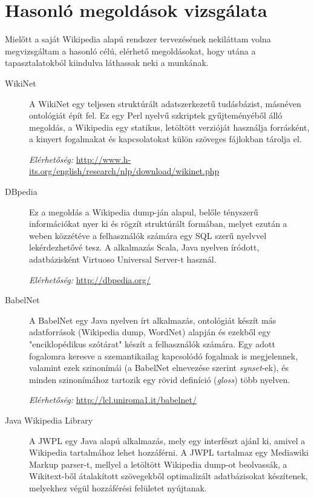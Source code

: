 \chapter{Hasonló megoldások vizsgálata}
\label{cha:related_work}

Mielőtt a saját Wikipedia alapú rendszer tervezésének nekiláttam volna megvizsgáltam a hasonló célú, elérhető megoldásokat, hogy utána a tapasztalatokból kiindulva láthassak neki a munkának.

\begin{description}
	\item[WikiNet\cite{wikinet}] A WikiNet egy teljesen struktúrált adatszerkezetű tudásbázist, másnéven ontológiát épít fel. Ez egy Perl nyelvű szkriptek gyűjteményéből álló megoldás, a Wikipedia egy statikus, letöltött verzióját használja forrásként, a kinyert fogalmakat és kapcsolatokat külön szöveges fájlokban tárolja el.
	
\textit{Elérhetőség:} \url{http://www.h-its.org/english/research/nlp/download/wikinet.php}

	\item[DBpedia] Ez a megoldás a Wikipedia dump-ján alapul, belőle tényszerű információkat nyer ki és rögzít struktúrált formában, melyet ezután a weben közzétéve a felhasználók számára egy SQL szerű nyelvvel lekérdezhetővé tesz. A alkalmazás Scala, Java nyelven íródott, adatbázisként Virtuoso Universal Server-t használ.
	
\textit{Elérhetőség:} \url{http://dbpedia.org/}

\item[BabelNet\cite{babelnet}] A BabelNet egy Java nyelven írt alkalmazás, ontológiát készít más adatforrások (Wikipedia dump, WordNet) alapján és ezekből egy "enciklopédikus szótárat" készít a felhasználók számára. Egy adott fogalomra keresve a szemantikailag kapcsolódó fogalmak is megjelennek, valamint ezek  szinonímái (a BabelNet elnevezése szerint \textit{synset}-ek), és minden szinonímához tartozik egy rövid definíció (\textit{gloss}) több nyelven.
	
\textit{Elérhetőség:} \url{http://lcl.uniroma1.it/babelnet/}

\item[Java Wikipedia Library\cite{jwpl}] A JWPL egy Java alapú alkalmazás, mely egy interfészt ajánl ki, amivel a Wikipedia tartalmához lehet hozzáférni. A JWPL tartalmaz egy Mediawiki Markup parser-t, mellyel a letöltött Wikipedia dump-ot beolvassák, a Wikitext-ből átalakított szövegekből optimalizált adatbázisokat készítenek, melyekhez végül hozzáférési felületet nyújtanak.
	

\end{description}
